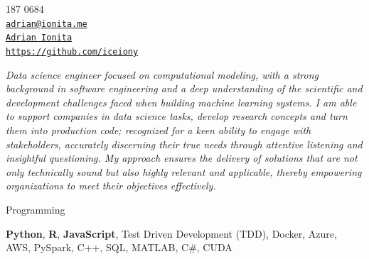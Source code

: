 \documentclass[11pt,article,oneside]{memoir}
\makeatletter
\def\myauthor{Adrian Ionita}
\def\myemail{adrian@ionita.me}
\def\myweb{https://github.com/iceiony}
\def\myphone{0797 187 0684}
\def\mytwitter{@iceiony}
\def\mylinkedin{https://uk.linkedin.com/in/adrian-ionita-6a923129}
\makeatother
\begin{document}
%
\hfill
\begin{minipage}[t]{1.3in}
  \flushright \footnotesize  \contactblock \myphone \, \faPhone \\ 
  {\scriptsize  \texttt{\href{mailto:\myemail}{\myemail}} \, \faEnvelope} \\
  {\scriptsize  \texttt{\href{\mylinkedin}{\myauthor}} \, \faLinkedinSquare }  \\ 
  {\scriptsize  \texttt{\href{\myweb}{\myweb}} \, \faGithub}
\end{minipage}

{\vskip -0.8cm}
\reversemarginpar

\bigskip      
\medskip

\noindent\emph{Data science engineer focused on computational modeling, with a strong background in software engineering and a deep understanding of the scientific and development challenges faced when building machine learning systems.
I am able to support companies in data science tasks, develop research concepts and turn them into production code; recognized for a keen ability to engage with stakeholders, accurately discerning their true needs through attentive listening and insightful questioning.
My approach ensures the delivery of solutions that are not only technically sound but also highly relevant and applicable, thereby empowering organizations to meet their objectives effectively.
}
\bigskip


\ind Programming

\ind \hspace{0.354in} \footnotesize \textbf{Python}, \textbf{R}, \textbf{JavaScript}, Test Driven Development (TDD), Docker, Azure, AWS, PySpark, C++, SQL, MATLAB, C\#, CUDA \normalsize 
\end{document}
